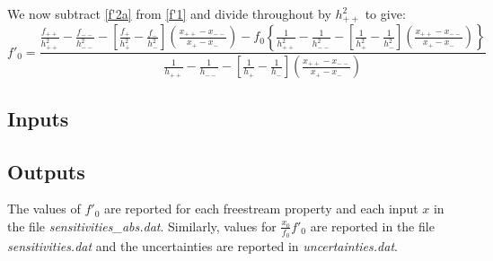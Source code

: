 We now subtract \cref{f'2a} from \cref{f'1} and divide throughout by $h_{++}^2$ to give:
\begin{equation}
f'_0 = \frac{\frac{f_{++}}{h_{++}^2} - \frac{f_{--}}{h_{--}^2} - \left[\frac{f_+}{h_+^2} - \frac{f_-}{h_-^2} \right] \left(\frac{x_{++} - x_{--}}{x_+ - x_-} \right) - f_0 \left\lbrace \frac{1}{h_{++}^2} - \frac{1}{h_{--}^2} - \left[\frac{1}{h_+^2} - \frac{1}{h_-^2} \right] \left(\frac{x_{++} - x_{--}}{x_+ - x_-} \right) \right\rbrace}{ \frac{1}{h_{++}} - \frac{1}{h_{--}} - \left[ \frac{1}{h_+} - \frac{1}{h_-} \right] \left(\frac{x_{++} - x_{--}}{x_+ - x_-}\right) }
\end{equation}



\subsection{Inputs}

\subsection{Outputs}
The values of $f'_0$ are reported for each freestream property and each input $x$ in the file \textit{sensitivities\_abs.dat}. Similarly, values for $\frac{x_0}{f_0}f'_0$ are reported in the file \textit{sensitivities.dat} and the uncertainties are reported in \textit{uncertainties.dat}.